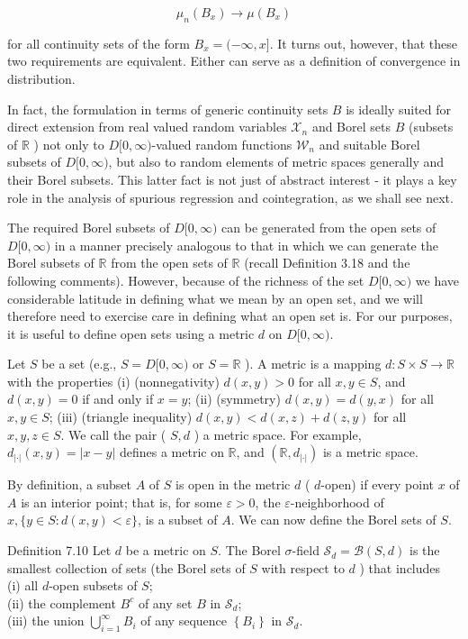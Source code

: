 \documentclass[10pt]{article}
\begin{document}
$$
\mu_{n}\left(B_{x}\right) \rightarrow \mu\left(B_{x}\right)
$$

for all continuity sets of the form $B_{x}=(-\infty, x]$. It turns out, however, that these two requirements are equivalent. Either can serve as a definition of convergence in distribution.

In fact, the formulation in terms of generic continuity sets $B$ is ideally suited for direct extension from real valued random variables $\mathcal{X}_{n}$ and Borel sets $B$ (subsets of $\mathbb{R}$ ) not only to $D[0, \infty)$-valued random functions $\mathcal{W}_{n}$ and suitable Borel subsets of $D[0, \infty)$, but also to random elements of metric spaces generally and their Borel subsets. This latter fact is not just of abstract interest - it plays a key role in the analysis of spurious regression and cointegration, as we shall see next.

The required Borel subsets of $D[0, \infty)$ can be generated from the open sets of $D[0, \infty)$ in a manner precisely analogous to that in which we can generate the Borel subsets of $\mathbb{R}$ from the open sets of $\mathbb{R}$ (recall Definition 3.18 and the following comments). However, because of the richness of the set $D[0, \infty)$ we have considerable latitude in defining what we mean by an open set, and we will therefore need to exercise care in defining what an open set is. For our purposes, it is useful to define open sets using a metric $d$ on $D[0, \infty)$.

Let $S$ be a set (e.g., $S=D[0, \infty)$ or $S=\mathbb{R}$ ). A metric is a mapping $d: S \times S \rightarrow \mathbb{R}$ with the properties (i) (nonnegativity) $d(x, y)>0$ for all $x, y \in S$, and $d(x, y)=0$ if and only if $x=y$; (ii) (symmetry) $d(x, y)= d(y, x)$ for all $x, y \in S$; (iii) (triangle inequality) $d(x, y)<d(x, z)+d(z, y)$ for all $x, y, z \in S$. We call the pair ( $S, d$ ) a metric space. For example, $d_{|\cdot|}(x, y)=|x-y|$ defines a metric on $\mathbb{R}$, and $\left(\mathbb{R}, d_{|\cdot|}\right)$ is a metric space.

By definition, a subset $A$ of $S$ is open in the metric $d$ ( $d$-open) if every point $x$ of $A$ is an interior point; that is, for some $\varepsilon>0$, the $\varepsilon$-neighborhood of $x,\{y \in S: d(x, y)<\varepsilon\}$, is a subset of $A$. We can now define the Borel sets of $S$.

Definition 7.10 Let $d$ be a metric on $S$. The Borel $\sigma$-field $\mathcal{S}_{d}=\mathcal{B}(S, d)$ is the smallest collection of sets (the Borel sets of $S$ with respect to $d$ ) that includes\\
(i) all $d$-open subsets of $S$;\\
(ii) the complement $B^{c}$ of any set $B$ in $\mathcal{S}_{d}$;\\
(iii) the union $\bigcup_{i=1}^{\infty} B_{i}$ of any sequence $\left\{B_{i}\right\}$ in $\mathcal{S}_{d}$.
\end{document}
